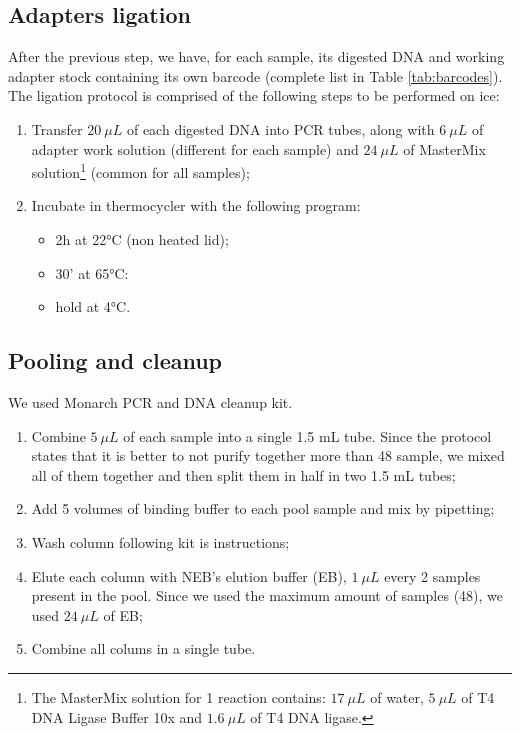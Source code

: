 \documentclass[a4paper, 12pt]{report}
\begin{document}
\subsection{Adapters ligation}
\vspace{-1em}
After the previous step, we have, for each sample, its digested DNA and working adapter stock containing its own barcode (complete list in Table \ref{tab:barcodes}). The ligation protocol is comprised of the following steps to be performed on ice:
\vspace{-1.5em}
\begin{enumerate}\setlength\itemsep{-0.2em}
	\item Transfer $20 \ \mu L$ of each digested DNA into PCR tubes, along with $6 \ \mu L$ of adapter work solution (different for each sample) and $24 \ \mu L$ of MasterMix solution\footnote{The MasterMix solution for 1 reaction contains: $17 \ \mu L$ of water, $5 \ \mu L$ of T4 DNA Ligase Buffer 10x and $1.6 \ \mu L$ of T4 DNA ligase.} (common for all samples);
	\item Incubate in thermocycler with the following program:
	\vspace{-1em}
	\begin{itemize}\setlength\itemsep{-0.2em}
		\item 2h at 22°C (non heated lid);
		\item 30' at 65°C:
		\item hold at 4°C.
	\end{itemize}
\end{enumerate}

\subsection{Pooling and cleanup}
\vspace{-1em}
We used Monarch PCR and DNA cleanup kit.
\vspace{-1.5em}
\begin{enumerate}\setlength\itemsep{-0.2em}
	\item Combine $5 \ \mu L$ of each sample into a single 1.5 mL tube. Since the protocol states that it is better to not purify together more than 48 sample, we mixed all of them together and then split them in half in two 1.5 mL tubes;
	\item Add 5 volumes of binding buffer to each pool sample and mix by pipetting;
	\item Wash column following kit is instructions;
	\item Elute each column with NEB's elution buffer (EB), $1 \ \mu L$ every 2 samples present in the pool. Since we used the maximum amount of samples (48), we used $24 \ \mu L$ of EB;
	\item Combine all colums in a single tube.
\end{enumerate}
\vspace{-1.4em}
\end{document}
